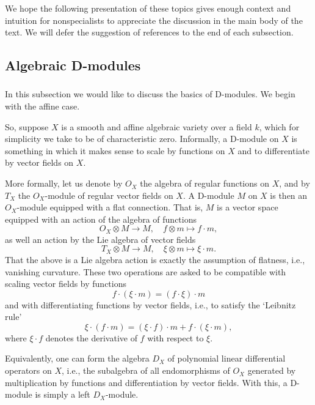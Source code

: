 \documentclass[10pt]{amsart}
\theoremstyle{remark}
\numberwithin{equation}{section}
\begin{document}
    We hope the following presentation of these topics gives enough context and intuition for nonspecialists to appreciate the discussion in the main body of the text. We will defer the suggestion of references to the end of each subsection. 
	
	\subsection{Algebraic D-modules}
	

	
	\subsubsection{}  In this subsection we would like to discuss the basics of D-modules. We begin with the affine case. 
	
	So, suppose $X$ is a smooth and affine algebraic variety 
	over a field $k$, which for simplicity we take to be of characteristic zero. Informally, a D-module on $X$ is something in which it 
	makes sense to scale by functions on $X$ and to differentiate by vector 
	fields on $X$. 
	
	More formally, let us denote by $O_X$ the algebra of regular functions on $X$, and 
	by $T_X$ the $O_X$-module of regular vector fields on $X$. A D-module $M$ on $X$ 
	is then an $O_X$-module equipped with a flat connection. That is, $M$ is a 
	vector space equipped with an action of the algebra of functions 
	\[
	O_X \otimes M \rightarrow M, \quad f \otimes m \mapsto f \cdot m,  
	\]
	as well an action by the Lie algebra of vector fields
	\[
	T_X \otimes M \rightarrow M, \quad \xi \otimes m \mapsto \xi \cdot m.
	\]
	That the above is a Lie algebra action is exactly the assumption of flatness, i.e., vanishing curvature. These two operations are asked to be compatible with scaling vector fields by functions 
	\[
	f \cdot (\xi \cdot m) = (f \cdot \xi) \cdot m
	\]
	and with differentiating functions by vector fields, i.e., to satisfy the `Leibnitz rule'
	\[
	\xi \cdot (f \cdot m) = (\xi \cdot f) \cdot m  + f \cdot (\xi \cdot m),
	\]
	where $\xi \cdot f$ denotes the derivative of $f$ with respect to $\xi$. 
	
	
	Equivalently, one can form the algebra $D_X$ of polynomial linear 
	differential operators on $X$, i.e., the subalgebra of all endomorphisms of $O_X$ generated by multiplication by functions and differentiation by vector fields. With this, a D-module is simply a left 
	$D_X$-module. 
	
\end{document}

